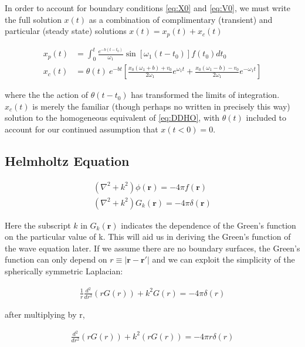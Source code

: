 \documentclass[11pt]{article}
\theoremstyle{plain}
\theoremstyle{definition}
\renewcommand{\vec}[1]{\mathbf{#1}} %
\begin{document}
In order to account for boundary conditions \eqref{eq:X0} and \eqref{eq:V0}, we must write the full solution $x(t)$ as a combination of complimentary (transient) and particular (steady state) solutions $x(t) = x_p(t) + x_c(t)$

\begin{align}
    x_p(t) &= \int_{0}^{t} \frac{e^{-b\left( t-t_0 \right)}}{\omega_1}\sin\left[ \omega_1 \left( t-t_0 \right) \right] f(t_0) dt_0 \\
    x_c(t) &=\theta(t) \  e^{-bt}\left[ \frac{x_0\left( \omega_1+b \right)+v_0  }{2\omega_1}e^{\omega_1 t} + \frac{x_0\left( \omega_1-b \right)-v_0  }{2\omega_1}e^{-\omega_1 t} \right]
\end{align}

where the the action of $\theta(t-t_0)$ has transformed the limits of integration. $x_c(t)$ is merely the familiar (though perhaps no written in precisely this way) solution to the homogeneous equivalent of \eqref{eq:DDHO}, with $\theta(t)$ included to account for our continued assumption that $x(t<0) = 0$.



\subsection{Helmholtz Equation}

\begin{align}
\left( \nabla^2+k^2 \right)\phi(\vec r) = -4\pi f(\vec r) \\
\left( \nabla^2+k^2 \right)G_k(\vec r) = -4\pi \delta(\vec r)
\end{align}

Here the subscript $k$ in $G_k(\vec r)$ indicates the dependence  of the Green's function on the particular value of k. This will aid us in deriving the Green's function of the wave equation later. If we assume there are no boundary surfaces, the Green's function can only depend on $r \equiv |\vec r - \vec r'|$ and we can exploit the simplicity of the spherically symmetric Laplacian:

\begin{align}
    \frac{1}{r} \frac{d^2}{dr^2} \left( rG(r) \right) + k^2 G(r) = -4\pi \delta(r)
\end{align}

after multiplying by r,

\begin{align}
    \frac{d^2}{dr^2} \left( rG(r) \right) + k^2 \left( rG(r)  \right) = -4\pi r \delta(r)
\end{align}
\end{document}
